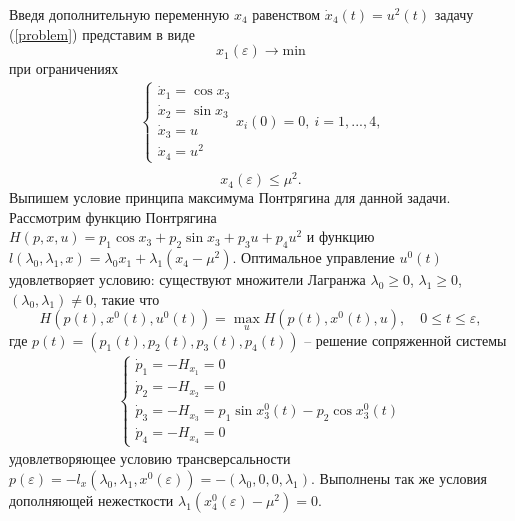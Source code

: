 \documentclass[../main.tex]{subfiles}
\begin{document}
Введя дополнительную переменную $ x_4 $ равенством
$
\dot{x}_4(t) = u^2(t)
$
задачу (\ref{problem}) представим в виде
\begin{equation}\label{problem2}
	x_1(\varepsilon)  \rightarrow \mathrm{min}
\end{equation}
при ограничениях
\begin{equation}\label{system2}
	\begin{array}{l}
		\left\{ {{{\begin{array}{l}
						{{{\dot x}_1} = \cos {x_3}}\\
						{{{\dot x}_2} = \sin {x_3}}\\
						{{{\dot x}_3} = u}\\
						{{{\dot x}_4} = {u^2}}
		\end{array}}}} \right.{x_i}\left( 0 \right) = 0, \ i = 1,...,4,\\
	\end{array}
\end{equation}
\begin{equation}\label{constraints2}
	{x_4}\left( \varepsilon  \right) \le {\mu ^2}.
\end{equation}
Выпишем условие принципа максимума Понтрягина для данной задачи.  Рассмотрим функцию Понтрягина
$
H(p,x,u) = p_1 \cos{x_3} + p_2 \sin {x_3} + p_3 u + p_4 u^2
$
и функцию
$
l(\lambda_0,\lambda_1,x) = \lambda_0 x_1  + \lambda_1 (x_4 - \mu^2).
$
Оптимальное управление $ u^0(t) $ удовлетворяет  условию: существуют множители Лагранжа  $ \lambda_0 \geq 0 $, $ \lambda_1 \geq 0 $, $ (\lambda_0,\lambda_1) \neq 0 $, такие что
$$H(p(t),x^0(t),u^0(t))=\max_u H(p(t),x^0(t),u), \quad 0\leq t \leq \varepsilon, $$
где $ p(t) = \left(p_1(t),p_2(t),p_3(t),p_4(t) \right)  $ -- решение сопряженной системы
\begin{equation*}
	\begin{array}{l}
		\left\{ {{{\begin{array}{l}
						{{{\dot p}_1} = -H_{x_1} = 0}\\
						{{{\dot p}_2} = -H_{x_2} = 0}\\
						{{{\dot p}_3} = -H_{x_3} = p_1 \sin x_3^0(t) - p_2 \cos x_3^0(t)}\\
						{{{\dot p}_4} = -H_{x_4} = 0}
		\end{array}}}} \right.
	\end{array}
\end{equation*}
удовлетворяющее условию трансверсальности
$
p(\varepsilon) = -l_x(\lambda_0,\lambda_1, x^0(\varepsilon)) = - (\lambda_0,0,0,\lambda_1).
$
Выполнены так же условия дополняющей нежесткости
$\lambda_1 (x_4^0(\varepsilon) - \mu^2) = 0$.
\end{document}
